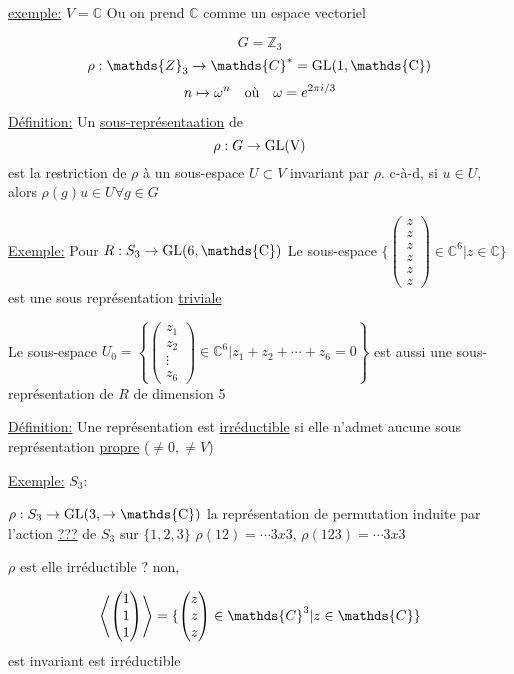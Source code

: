 \underline{exemple:} $V = \mathds{C}$ Ou on prend $\mathds{C}$ comme un espace vectoriel 


\[ G = \mathds{Z}_3 \]
\[ \rho : \mathds{Z}_3 \to \mathds{C}^{*} = \rm{GL(1, \mathds{C})} \]
\[ n \mapsto \omega^{n}\qq{où} \omega = e^{2\pi i /3} \]

\underline{Définition:} Un \underline{sous-représentaation} de \[ \rho: G \to \rm{GL}(V) \]  est la restriction de $\rho$ à un sous-espace $U\subset V$ invariant par $\rho$. c-à-d, si $u \in U$, alors $\rho(g) u \in U\forall g \in G$

\underline{Exemple:} Pour $R: S_3 \to \rm{GL}(6, \mathds{C})$ 
Le sous-espace $\{ \begin{pmatrix} z\\z\\z\\z\\z\\z \end{pmatrix} \in \mathds{C}^6 | z \in \mathds{C} \} $ est une sous représentation \underline{triviale} 

Le sous-espace $U_0 = \left\{ \begin{pmatrix} z_1 \\ z_2 \\ \vdots \\ z_6 \end{pmatrix} \in \mathds{C}^6 | z_1 + z_2 + \dotsb + z_6 = 0 \right\} $	est aussi une sous-représentation de $R$ de dimension 5


\underline{Définition:} Une représentation est \underline{irréductible} si elle n'admet aucune sous représentation \underline{propre} ($\neq 0, \neq V$)   


\underline{Exemple:} $S_3$:

$\rho: S_3 \to \rm{GL}(3, \to \mathds{C})$ la représentation de permutation induite par l'action \underline{???} de $S_3$ sur $\{ 1,2,3 \} $ 
$\rho(12) = \dotsb 3x3,\, \rho(123) = \dotsb 3x3$

$\rho$ est elle irréductible ? non, 

\[ \expval{ \begin{pmatrix} 1 \\ 1 \\1 \end{pmatrix}  } = \{ 	\begin{pmatrix} z\\z\\z \end{pmatrix} \in \mathds{C}^3 | z \in \mathds{C} \}  \]
est invariant est irréductible


